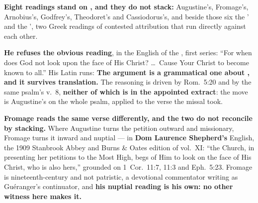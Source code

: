 \textbf{Eight readings stand on , and they
do not stack:} Augustine's, Fromage's, Arnobius's, Godfrey's, Theodoret's and
Cassiodorus's, and beside those six the ' and the
', two Greek readings of contested attribution
that run directly against each other.

\begin{witnessnote}
 \textbf{He refuses the obvious reading}, in the English of the
, first series: ``For when does God not look
upon the face of His Christ? \dots\ Cause Your Christ to become known to all.''
His Latin runs:  \textbf{The argument is a
grammatical one about , and it survives translation.} The reasoning
is driven by Rom.\ 5:20 and by the
same psalm's v.~8, \textbf{neither of which is in the appointed extract}: the
move is Augustine's on the whole psalm, applied to the verse the missal took.
\end{witnessnote}

\textbf{Fromage reads the same verse differently, and the two do not reconcile
by stacking.} Where Augustine turns the petition outward and missionary,
Fromage turns it inward and nuptial --- in \textbf{Dom Laurence Shepherd's}
English, the 1909 Stanbrook Abbey and Burns \& Oates edition of  vol.~XI: ``the
Church, in presenting her petitions to the Most High, begs of Him to look on the
face of His Christ, who is also hers,'' grounded on 1~Cor.\ 11:7, 11:3 and
Eph.\ 5:23. Fromage is nineteenth-century and not patristic, a devotional
commentator writing as Guéranger's continuator, and \textbf{his nuptial reading
is his own: no other witness here makes it.}

